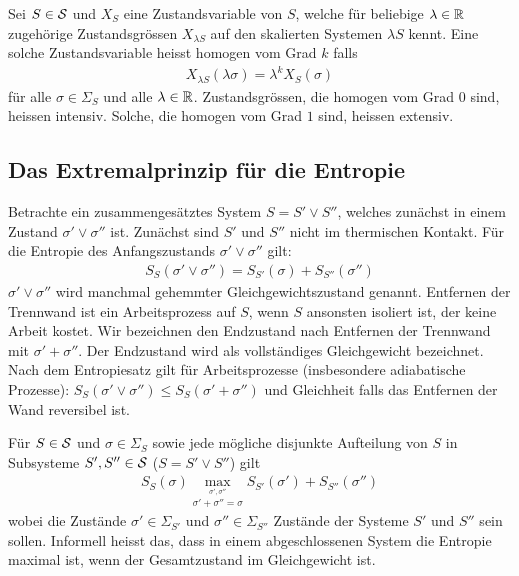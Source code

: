 \begin{definition}
    Sei $S \in \S$ und $X_S$ eine Zustandsvariable von $S$, welche
    für beliebige $\lambda \in \R$ zugehörige Zustandsgrössen $X_{\lambda S}$
    auf den skalierten Systemen $\lambda S$ kennt. Eine solche Zustandsvariable
    heisst homogen vom Grad $k$ falls
    \begin{align*}
        X_{\lambda S} (\lambda \sigma) = \lambda^k X_{S} (\sigma)
    \end{align*}
    für alle $\sigma \in \Sigma_S$ und alle $\lambda \in \R$. Zustandsgrössen,
    die homogen vom Grad $0$ sind, heissen intensiv. Solche, die homogen
    vom Grad $1$ sind, heissen extensiv.
\end{definition}


\subsection{Das Extremalprinzip für die Entropie}

Betrachte ein zusammengesätztes System $S = S' \vee S''$, welches zunächst
in einem Zustand $\sigma' \vee \sigma''$ ist. Zunächst sind $S'$ und $S''$
nicht im thermischen Kontakt. Für die Entropie des Anfangszustands
$\sigma' \vee \sigma''$ gilt:
\begin{align*}
    S_S(\sigma' \vee \sigma'') = S_{S'} (\sigma) + S_{S''} (\sigma'')
\end{align*}
$\sigma' \vee \sigma''$ wird manchmal gehemmter Gleichgewichtszustand genannt.
Entfernen der Trennwand ist ein Arbeitsprozess auf $S$, wenn $S$ ansonsten
isoliert ist, der keine Arbeit kostet. Wir bezeichnen den Endzustand nach
Entfernen der Trennwand mit $\sigma' + \sigma''$. Der Endzustand wird als
vollständiges Gleichgewicht bezeichnet. Nach dem Entropiesatz gilt für
Arbeitsprozesse (insbesondere adiabatische Prozesse): $S_S (\sigma' \vee
\sigma'') \leq S_S (\sigma' + \sigma'')$ und Gleichheit falls das Entfernen
der Wand reversibel ist.

\begin{theorem}
    Für $S \in \S$ und $\sigma \in \Sigma_S$ sowie jede mögliche disjunkte
    Aufteilung von $S$ in Subsysteme $S',S'' \in \S$ ($S = S' \vee S''$)
    gilt
    \begin{align*}
        S_S (\sigma) \max_{\stackrel{\sigma',\sigma''}{\sigma' + \sigma'' = \sigma}}
            S_{S'} (\sigma') + S_{S''}(\sigma'')
    \end{align*}
    wobei die Zustände $\sigma' \in \Sigma_{S'}$ und $\sigma'' \in \Sigma_{S''}$
    Zustände der Systeme $S'$ und $S''$ sein sollen. Informell heisst das,
    dass in einem abgeschlossenen System die Entropie maximal ist, wenn
    der Gesamtzustand im Gleichgewicht ist.
\end{theorem}

